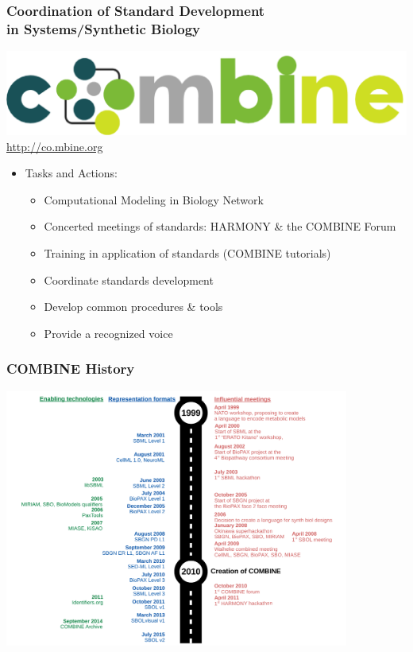 \documentclass{beamer}
\begin{document}
\begin{frame}\frametitle{Coordination of Standard Development\\ in Systems/Synthetic Biology}
\begin{center}
\includegraphics[width=\textwidth]{figs/COMBINE}\\
{\LARGE \url{http://co.mbine.org}}
\end{center}
\begin{itemize}
\item Tasks and Actions:
\begin{itemize}
\item Computational Modeling in Biology Network
\item Concerted meetings of standards: HARMONY \& the COMBINE Forum
\item Training in application of standards (COMBINE tutorials)
\item Coordinate standards development
\item Develop common procedures \& tools
\item Provide a recognized voice
\end{itemize}
\end{itemize}
\end{frame}


\begin{frame}\frametitle{COMBINE History}
\begin{center}
\includegraphics[width=0.85\textwidth]{figs/COMBINE-history}
\end{center}
\end{frame}
\end{document}
